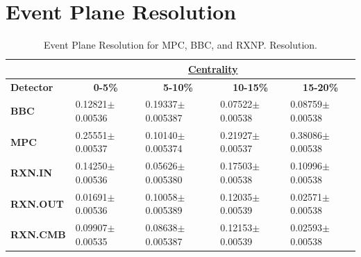\section{Event Plane Resolution}
\label{secteperr}
\begin{table}[htbp!]
\centering
\caption{Event Plane Resolution for MPC, BBC, and RXNP. Resolution.}
\label{EPrestable}
\begin{tabular}{lllll}
\textbf{}                                    & \multicolumn{4}{c}{{\ul \textbf{Centrality}}}                                                                                                                              \\ \hline
\multicolumn{1}{|l|}{\textbf{Detector}} & \multicolumn{1}{c|}{\textbf{0-5\%}}      & \multicolumn{1}{c|}{\textbf{5-10\%}}      & \multicolumn{1}{c|}{\textbf{10-15\%}}    & \multicolumn{1}{c|}{\textbf{15-20\%}}    \\ \hline
\multicolumn{1}{|l|}{\textbf{BBC}}           & \multicolumn{1}{l|}{0.12821$\pm$0.00536} & \multicolumn{1}{l|}{0.19337$\pm$0.005387} & \multicolumn{1}{l|}{0.07522$\pm$0.00538} & \multicolumn{1}{l|}{0.08759$\pm$0.00538} \\ \hline
\multicolumn{1}{|l|}{\textbf{MPC}}           & \multicolumn{1}{l|}{0.25551$\pm$0.00537} & \multicolumn{1}{l|}{0.10140$\pm$0.005374} & \multicolumn{1}{l|}{0.21927$\pm$0.00537} & \multicolumn{1}{l|}{0.38086$\pm$0.00538} \\ \hline
\multicolumn{1}{|l|}{\textbf{RXN.IN}}        & \multicolumn{1}{l|}{0.14250$\pm$0.00536} & \multicolumn{1}{l|}{0.05626$\pm$0.005380} & \multicolumn{1}{l|}{0.17503$\pm$0.00538} & \multicolumn{1}{l|}{0.10996$\pm$0.00538} \\ \hline
\multicolumn{1}{|l|}{\textbf{RXN.OUT}}       & \multicolumn{1}{l|}{0.01691$\pm$0.00536} & \multicolumn{1}{l|}{0.10058$\pm$0.005389} & \multicolumn{1}{l|}{0.12035$\pm$0.00539} & \multicolumn{1}{l|}{0.02571$\pm$0.00538} \\ \hline
\multicolumn{1}{|l|}{\textbf{RXN.CMB}}       & \multicolumn{1}{l|}{0.09907$\pm$0.00535} & \multicolumn{1}{l|}{0.08638$\pm$0.005387} & \multicolumn{1}{l|}{0.12153$\pm$0.00539} & \multicolumn{1}{l|}{0.02593$\pm$0.00538} \\ \hline
\end{tabular}
\end{table}

